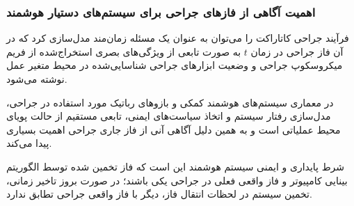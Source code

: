 \documentclass{article}
\begin{document}
\subsubsection{اهمیت آگاهی از فازهای جراحی برای سیستم‌های دستیار هوشمند}
فرآیند جراحی کاتاراکت را می‌توان به عنوان یک مسئله زمان‌مند مدل‌سازی کرد که در آن فاز جراحی در زمان $t$ به صورت تابعی از ویژگی‌های بصری استخراج‌شده از فریم میکروسکوپ جراحی و وضعیت ابزارهای جراحی شناسایی‌شده در محیط متغیر عمل نوشته می‌شود.

در معماری سیستم‌های هوشمند کمکی و بازوهای رباتیک مورد استفاده در جراحی، مدل‌سازی رفتار سیستم و اتخاذ سیاست‌های ایمنی، تابعی مستقیم از حالت پویای محیط عملیاتی است و به همین دلیل آگاهی آنی از فاز جاری جراحی اهمیت بسیاری پیدا می‌کند.

شرط پایداری و ایمنی سیستم هوشمند این است که فاز تخمین شده توسط الگوریتم بینایی کامپیوتر و فاز واقعی فعلی در جراحی یکی باشند؛ در صورت بروز تاخیر زمانی، تخمین سیستم در لحظات انتقال فاز، دیگر با فاز واقعی جراحی تطابق ندارد.
\end{document}
